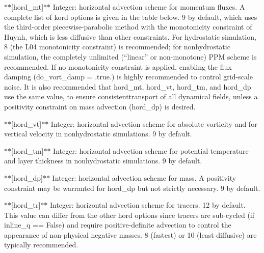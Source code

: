$\ast$$\ast$\mbox{[}hord\-\_\-mt\mbox{]}$\ast$$\ast$ Integer\-: horizontal advection scheme for momentum fluxes. A complete list of kord options is given in the table below. 9 by default, which uses the third-\/order piecewise-\/parabolic method with the monotonicity constraint of Huynh, which is less diffusive than other constraints. For hydrostatic simulation, 8 (the L04 monotonicity constraint) is recommended; for nonhydrostatic simulation, the completely unlimited (``linear'' or non-\/monotone) P\-P\-M scheme is recommended. If no monotonicity constraint is applied, enabling the flux damping (do\-\_\-vort\-\_\-damp = .true.) is highly recommended to control grid-\/scale noise. It is also recommended that hord\-\_\-mt, hord\-\_\-vt, hord\-\_\-tm, and hord\-\_\-dp use the same value, to ensure consistenttransport of all dynamical fields, unless a positivity constraint on mass advection (hord\-\_\-dp) is desired.

$\ast$$\ast$\mbox{[}hord\-\_\-vt\mbox{]}$\ast$$\ast$ Integer\-: horizontal advection scheme for absolute vorticity and for vertical velocity in nonhydrostatic simulations. 9 by default.

$\ast$$\ast$\mbox{[}hord\-\_\-tm\mbox{]}$\ast$$\ast$ Integer\-: horizontal advection scheme for potential temperature and layer thickness in nonhydrostatic simulations. 9 by default.

$\ast$$\ast$\mbox{[}hord\-\_\-dp\mbox{]}$\ast$$\ast$ Integer\-: horizontal advection scheme for mass. A positivity constraint may be warranted for hord\-\_\-dp but not strictly necessary. 9 by default.

$\ast$$\ast$\mbox{[}hord\-\_\-tr\mbox{]}$\ast$$\ast$ Integer\-: horizontal advection scheme for tracers. 12 by default. This value can differ from the other hord options since tracers are sub-\/cycled (if inline\-\_\-q == False) and require positive-\/definite advection to control the appearance of non-\/physical negative masses. 8 (fastest) or 10 (least diffusive) are typically recommended.

